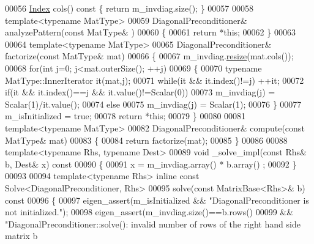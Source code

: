 \begin{DoxyCode}
00056     \hyperlink{namespace_eigen_a62e77e0933482dafde8fe197d9a2cfde}{Index} cols()\textcolor{keyword}{ const }\{ \textcolor{keywordflow}{return} m\_invdiag.size(); \}
00057     
00058     \textcolor{keyword}{template}<\textcolor{keyword}{typename} MatType>
00059     DiagonalPreconditioner& analyzePattern(\textcolor{keyword}{const} MatType& )
00060     \{
00061       \textcolor{keywordflow}{return} *\textcolor{keyword}{this};
00062     \}
00063     
00064     \textcolor{keyword}{template}<\textcolor{keyword}{typename} MatType>
00065     DiagonalPreconditioner& factorize(\textcolor{keyword}{const} MatType& mat)
00066     \{
00067       m\_invdiag.\hyperlink{class_eigen_1_1_plain_object_base_a99d9054ee2d5a40c6e00ded0265e9cea}{resize}(mat.cols());
00068       \textcolor{keywordflow}{for}(\textcolor{keywordtype}{int} j=0; j<mat.outerSize(); ++j)
00069       \{
00070         \textcolor{keyword}{typename} MatType::InnerIterator it(mat,j);
00071         \textcolor{keywordflow}{while}(it && it.index()!=j) ++it;
00072         \textcolor{keywordflow}{if}(it && it.index()==j && it.value()!=Scalar(0))
00073           m\_invdiag(j) = Scalar(1)/it.value();
00074         \textcolor{keywordflow}{else}
00075           m\_invdiag(j) = Scalar(1);
00076       \}
00077       m\_isInitialized = \textcolor{keyword}{true};
00078       \textcolor{keywordflow}{return} *\textcolor{keyword}{this};
00079     \}
00080     
00081     \textcolor{keyword}{template}<\textcolor{keyword}{typename} MatType>
00082     DiagonalPreconditioner& compute(\textcolor{keyword}{const} MatType& mat)
00083     \{
00084       \textcolor{keywordflow}{return} factorize(mat);
00085     \}
00086 
00088     \textcolor{keyword}{template}<\textcolor{keyword}{typename} Rhs, \textcolor{keyword}{typename} Dest>
00089     \textcolor{keywordtype}{void} \_solve\_impl(\textcolor{keyword}{const} Rhs& b, Dest& x)\textcolor{keyword}{ const}
00090 \textcolor{keyword}{    }\{
00091       x = m\_invdiag.array() * b.array() ;
00092     \}
00093 
00094     \textcolor{keyword}{template}<\textcolor{keyword}{typename} Rhs> \textcolor{keyword}{inline} \textcolor{keyword}{const} Solve<DiagonalPreconditioner, Rhs>
00095     solve(\textcolor{keyword}{const} MatrixBase<Rhs>& b)\textcolor{keyword}{ const}
00096 \textcolor{keyword}{    }\{
00097       eigen\_assert(m\_isInitialized && \textcolor{stringliteral}{"DiagonalPreconditioner is not initialized."});
00098       eigen\_assert(m\_invdiag.size()==b.rows()
00099                 && \textcolor{stringliteral}{"DiagonalPreconditioner::solve(): invalid number of rows of the right hand side matrix b
}
\end{DoxyCode}
